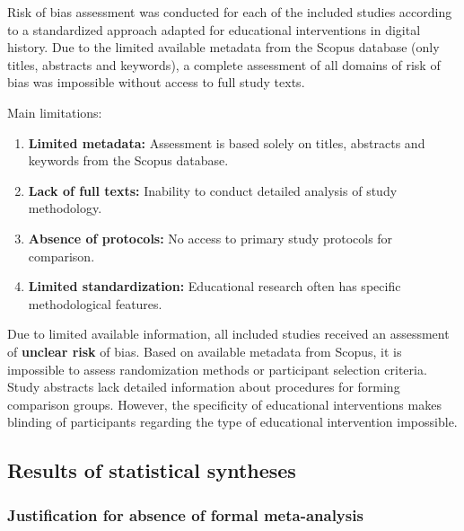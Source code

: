 \documentclass[
hf,
]{ceurart}
\begin{document}
Risk of bias assessment was conducted for each of the included studies according to a standardized approach adapted for educational interventions in digital history. Due to the limited available metadata from the Scopus database (only titles, abstracts and keywords), a complete assessment of all domains of risk of bias was impossible without access to full study texts.


{Main limitations:}

\begin{enumerate}
\item \textbf{Limited metadata:} Assessment is based solely on titles, abstracts and keywords from the Scopus database.
\item \textbf{Lack of full texts:} Inability to conduct detailed analysis of study methodology.
\item \textbf{Absence of protocols:} No access to primary study protocols for comparison.
\item \textbf{Limited standardization:} Educational research often has specific methodological features.
\end{enumerate}

Due to limited available information, all included studies received an assessment of \textbf{unclear risk} of bias. Based on available metadata from Scopus, it is impossible to assess randomization methods or participant selection criteria. Study abstracts lack detailed information about procedures for forming comparison groups. However, the specificity of educational interventions makes blinding of participants regarding the type of educational intervention impossible.


\subsection{Results of statistical syntheses}

\subsubsection{Justification for absence of formal meta-analysis}
\end{document}
